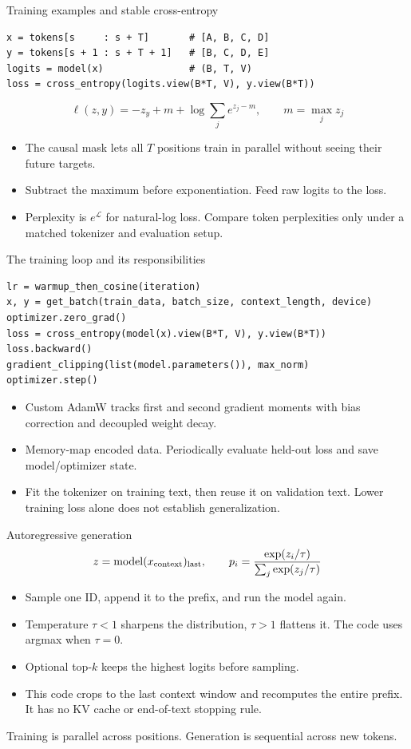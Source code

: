 \documentclass[11pt,aspectratio=169]{beamer}
\begin{document}
\begin{frame}[fragile]{Training examples and stable cross-entropy}
\begin{lstlisting}
x = tokens[s     : s + T]       # [A, B, C, D]
y = tokens[s + 1 : s + T + 1]   # [B, C, D, E]
logits = model(x)               # (B, T, V)
loss = cross_entropy(logits.view(B*T, V), y.view(B*T))
\end{lstlisting}
\[
\ell(z,y)=-z_y+m+\log\sum_j e^{z_j-m},\qquad m=\max_j z_j
\]
\begin{itemize}
\item The causal mask lets all $T$ positions train in parallel without seeing their future targets.
\item Subtract the maximum before exponentiation. Feed raw logits to the loss.
\item Perplexity is $e^{\mathcal L}$ for natural-log loss. Compare token perplexities only under a matched tokenizer and evaluation setup.
\end{itemize}
\end{frame}

\begin{frame}[fragile]{The training loop and its responsibilities}
\begin{lstlisting}
lr = warmup_then_cosine(iteration)
x, y = get_batch(train_data, batch_size, context_length, device)
optimizer.zero_grad()
loss = cross_entropy(model(x).view(B*T, V), y.view(B*T))
loss.backward()
gradient_clipping(list(model.parameters()), max_norm)
optimizer.step()
\end{lstlisting}
\begin{itemize}
\item Custom AdamW tracks first and second gradient moments with bias correction and decoupled weight decay.
\item Memory-map encoded data. Periodically evaluate held-out loss and save model/optimizer state.
\item Fit the tokenizer on training text, then reuse it on validation text. Lower training loss alone does not establish generalization.
\end{itemize}
\end{frame}

\begin{frame}{Autoregressive generation}
\[
z=\operatorname{model}(x_{\rm context})_{\rm last},\qquad
p_i=\frac{\exp(z_i/\tau)}{\sum_j\exp(z_j/\tau)}
\]
\begin{itemize}
\item Sample one ID, append it to the prefix, and run the model again.
\item Temperature $\tau<1$ sharpens the distribution, $\tau>1$ flattens it. The code uses argmax when $\tau=0$.
\item Optional top-$k$ keeps the highest logits before sampling.
\item This code crops to the last context window and recomputes the entire prefix. It has no KV cache or end-of-text stopping rule.
\end{itemize}
\alert{Training is parallel across positions. Generation is sequential across new tokens.}
\end{frame}
\end{document}
